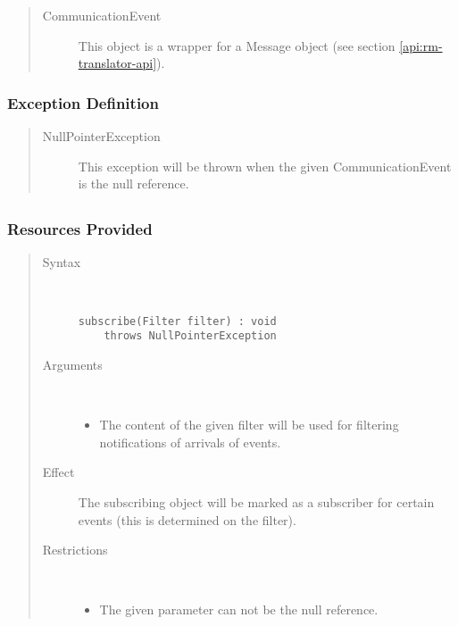 \begin{quote}
	\begin{description}
		\item[CommunicationEvent] This object is a wrapper for a Message object (see
		section \ref{api:rm-translator-api}).
	\end{description} 
\end{quote}

\subsubsection{Exception Definition} 

\begin{quote}
	\begin{description}
		\item[NullPointerException] This exception will be thrown when the given
		CommunicationEvent is the null reference.
	\end{description} 
\end{quote}

\subsection{}

\subsubsection{Resources Provided}

\begin{quote}
	\begin{description}
		\item[Syntax] \
		\begin{verbatim}
subscribe(Filter filter) : void
    throws NullPointerException
		\end{verbatim}
		\item[Arguments] \
		\begin{itemize}
		  \item The content of the given filter will be used for filtering
		  notifications of arrivals of events.
		\end{itemize}
		\item[Effect] The subscribing object will be marked as a subscriber for
		certain events (this is determined on the filter).
		\item[Restrictions] \
		\begin{itemize}
		  \item The given parameter can not be the null reference.
		\end{itemize}
	\end{description} 
\end{quote}

